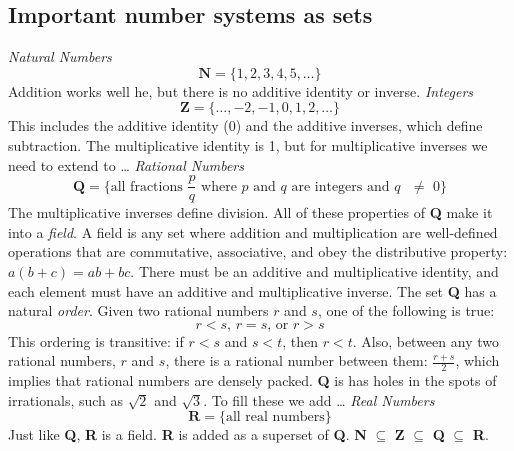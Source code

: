     \subsection*{Important number systems as sets}
        \textit{Natural Numbers}
        \begin{equation*}
            \textbf{N} = \{1,2,3,4,5,\dots\}
        \end{equation*}
        \indent Addition works well he, but there is no additive identity or inverse.
        \newline \newline
        \textit{Integers}
        \begin{equation*}
            \textbf{Z} = \{\dots,-2,-1,0,1,2,\dots\}
        \end{equation*}
        \indent This includes the additive identity (0) and the additive inverses, which define subtraction. The multiplicative identity is 1, but for multiplicative inverses we need to extend to \dots
        \newline \newline
        \textit{Rational Numbers}
        \begin{equation*}
            \textbf{Q} = \{\text{all fractions $\frac{p}{q}$ where $p$ and $q$ are integers and $q$ $\neq$ 0}\}
        \end{equation*}
        \indent The multiplicative inverses define division. All of these properties of \textbf{Q} make it into a \textit{field}. A field is any set where addition and multiplication are well-defined operations that are commutative, associative, and obey the distributive property: $a(b + c) = ab + bc$. There must be an additive and multiplicative identity, and each element must have an additive and multiplicative inverse.
        \newline
        \indent The set \textbf{Q} has a natural \textit{order}. Given two rational numbers $r$ and $s$, one of the following is true:
        \begin{equation*}
            \text{$r < s$, $r = s$, or $r > s$}
        \end{equation*}
        This ordering is transitive: if $r < s$ and $s < t$, then $r < t$. Also, between any two rational numbers, $r$ and $s$, there is a rational number between them: $\frac{r+s}{2}$, which implies that rational numbers are densely packed. 
        \newline 
        \indent \textbf{Q} is has holes in the spots of irrationals, such as $\sqrt{2}$ and $\sqrt{3}$. To fill these we add \dots
        \newline \newline
        \textit{Real Numbers}
        \begin{equation*}
            \textbf{R} = \{\text{all real numbers}\}
        \end{equation*}
        \indent Just like \textbf{Q}, \textbf{R} is a field. \textbf{R} is added as a superset of \textbf{Q}. \textbf{N} $\subseteq$ \textbf{Z} $\subseteq$ \textbf{Q} $\subseteq$ \textbf{R}.